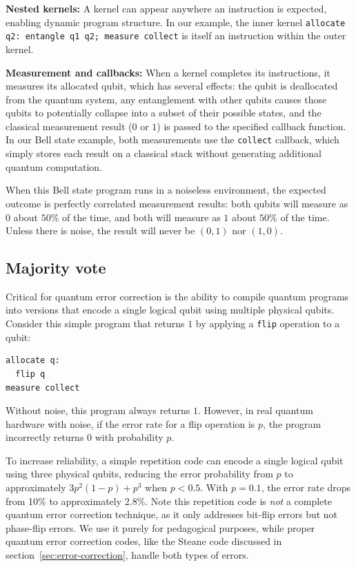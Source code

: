 \textbf{Nested kernels:} A kernel can appear anywhere an instruction is expected, enabling dynamic program structure. In our example, the inner kernel \texttt{allocate q2: entangle q1 q2; measure collect} is itself an instruction within the outer kernel. 

\textbf{Measurement and callbacks:} When a kernel completes its instructions, it measures its allocated qubit, which has several effects: the qubit is deallocated from the quantum system, any entanglement with other qubits causes those qubits to potentially collapse into a subset of their possible states, and the classical measurement result ($0$ or $1$) is passed to the specified callback function. In our Bell state example, both measurements use the \texttt{collect} callback, which simply stores each result on a classical stack without generating additional quantum computation.

When this Bell state program runs in a noiseless environment, the expected outcome is perfectly correlated measurement results: both qubits will measure as $0$ about $50\%$ of the time, and both will measure as $1$ about $50\%$ of the time. Unless there is noise, the result will never be $(0,1)$ nor $(1,0)$. 


\subsection{Majority vote}\label{sec:majority-vote}

Critical for quantum error correction is the ability to compile quantum programs into versions that encode a single logical qubit using multiple physical qubits. Consider this simple program that returns $1$ by applying a \texttt{flip} operation to a qubit:

\begin{verbatim}
allocate q:
  flip q
measure collect
\end{verbatim}

Without noise, this program always returns $1$. However, in real quantum hardware with noise, if the error rate for a flip operation is $p$, the program incorrectly returns $0$ with probability $p$.

To increase reliability, a simple repetition code can encode a single logical qubit using three physical qubits, reducing the error probability from $p$ to approximately $3p^2(1-p) + p^3$ when $p < 0.5$. With $p = 0.1$, the error rate drops from 10\% to approximately 2.8\%. Note this repetition code is \textit{not} a complete quantum error correction technique, as it only addresses bit-flip errors but not phase-flip errors. We use it purely for pedagogical purposes, while proper quantum error correction codes, like the Steane code discussed in section~\ref{sec:error-correction}, handle both types of errors.

